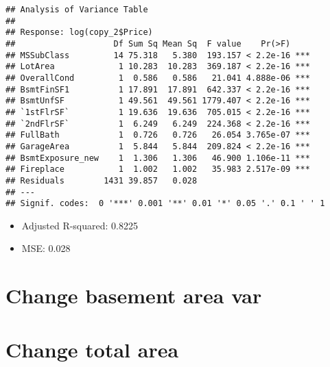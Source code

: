 \documentclass[]{article}
\newenvironment{Shaded}{\begin{snugshade}}{\end{snugshade}}
\newcommand{\CommentTok}[1]{\textcolor[rgb]{0.56,0.35,0.01}{\textit{#1}}}
\newcommand{\NormalTok}[1]{#1}
\newcommand{\OperatorTok}[1]{\textcolor[rgb]{0.81,0.36,0.00}{\textbf{#1}}}
\newcommand{\StringTok}[1]{\textcolor[rgb]{0.31,0.60,0.02}{#1}}
\providecommand{\tightlist}{%
  \setlength{\itemsep}{0pt}\setlength{\parskip}{0pt}}
\begin{document}
\begin{verbatim}
## Analysis of Variance Table
## 
## Response: log(copy_2$Price)
##                    Df Sum Sq Mean Sq  F value    Pr(>F)    
## MSSubClass         14 75.318   5.380  193.157 < 2.2e-16 ***
## LotArea             1 10.283  10.283  369.187 < 2.2e-16 ***
## OverallCond         1  0.586   0.586   21.041 4.888e-06 ***
## BsmtFinSF1          1 17.891  17.891  642.337 < 2.2e-16 ***
## BsmtUnfSF           1 49.561  49.561 1779.407 < 2.2e-16 ***
## `1stFlrSF`          1 19.636  19.636  705.015 < 2.2e-16 ***
## `2ndFlrSF`          1  6.249   6.249  224.368 < 2.2e-16 ***
## FullBath            1  0.726   0.726   26.054 3.765e-07 ***
## GarageArea          1  5.844   5.844  209.824 < 2.2e-16 ***
## BsmtExposure_new    1  1.306   1.306   46.900 1.106e-11 ***
## Fireplace           1  1.002   1.002   35.983 2.517e-09 ***
## Residuals        1431 39.857   0.028                       
## ---
## Signif. codes:  0 '***' 0.001 '**' 0.01 '*' 0.05 '.' 0.1 ' ' 1
\end{verbatim}

\begin{itemize}
\tightlist
\item
  Adjusted R-squared: 0.8225
\item
  MSE: 0.028
\end{itemize}

\hypertarget{change-basement-area-var}{%
\section{Change basement area var}\label{change-basement-area-var}}

\begin{Shaded}
\end{Shaded}

\hypertarget{change-total-area}{%
\section{Change total area}\label{change-total-area}}
\end{document}
